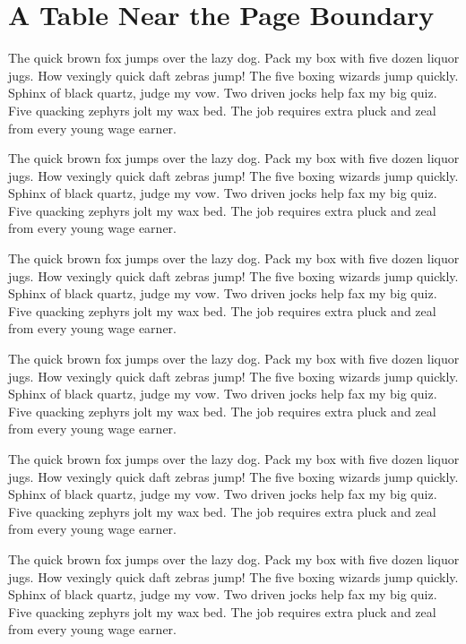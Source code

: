 \documentclass[acmsmall,nonacm]{acmart}
\begin{document}
\thispagestyle{empty}%

\section{A Table Near the Page Boundary}

The quick brown fox jumps over the lazy dog. Pack my box with five dozen liquor
jugs. How vexingly quick daft zebras jump! The five boxing wizards jump quickly.
Sphinx of black quartz, judge my vow. Two driven jocks help fax my big quiz.
Five quacking zephyrs jolt my wax bed. The job requires extra pluck and zeal
from every young wage earner.

The quick brown fox jumps over the lazy dog. Pack my box with five dozen liquor
jugs. How vexingly quick daft zebras jump! The five boxing wizards jump quickly.
Sphinx of black quartz, judge my vow. Two driven jocks help fax my big quiz.
Five quacking zephyrs jolt my wax bed. The job requires extra pluck and zeal
from every young wage earner.

The quick brown fox jumps over the lazy dog. Pack my box with five dozen liquor
jugs. How vexingly quick daft zebras jump! The five boxing wizards jump quickly.
Sphinx of black quartz, judge my vow. Two driven jocks help fax my big quiz.
Five quacking zephyrs jolt my wax bed. The job requires extra pluck and zeal
from every young wage earner.

The quick brown fox jumps over the lazy dog. Pack my box with five dozen liquor
jugs. How vexingly quick daft zebras jump! The five boxing wizards jump quickly.
Sphinx of black quartz, judge my vow. Two driven jocks help fax my big quiz.
Five quacking zephyrs jolt my wax bed. The job requires extra pluck and zeal
from every young wage earner.

The quick brown fox jumps over the lazy dog. Pack my box with five dozen liquor
jugs. How vexingly quick daft zebras jump! The five boxing wizards jump quickly.
Sphinx of black quartz, judge my vow. Two driven jocks help fax my big quiz.
Five quacking zephyrs jolt my wax bed. The job requires extra pluck and zeal
from every young wage earner.

The quick brown fox jumps over the lazy dog. Pack my box with five dozen liquor
jugs. How vexingly quick daft zebras jump! The five boxing wizards jump quickly.
Sphinx of black quartz, judge my vow. Two driven jocks help fax my big quiz.
Five quacking zephyrs jolt my wax bed. The job requires extra pluck and zeal
from every young wage earner.
\end{document}
